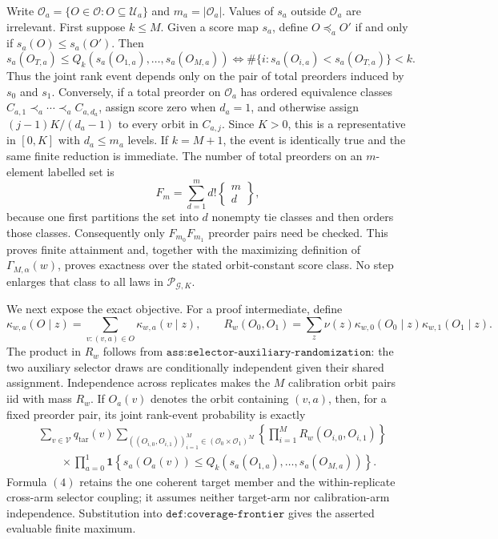 Write \(\mathcal O_a=\{O\in\mathcal O:O\subseteq\mathcal U_a\}\) and \(m_a=|\mathcal O_a|\). Values of \(s_a\) outside \(\mathcal O_a\) are irrelevant. First suppose \(k\le M\). Given a score map \(s_a\), define \(O\preceq_a O'\) if and only if \(s_a(O)\le s_a(O')\). Then
\[s_a(O_{T,a})\le Q_k(s_a(O_{1,a}),\ldots,s_a(O_{M,a}))\iff \#\{i:s_a(O_{i,a})<s_a(O_{T,a})\}<k.\tag{1}\]
Thus the joint rank event depends only on the pair of total preorders induced by \(s_0\) and \(s_1\). Conversely, if a total preorder on \(\mathcal O_a\) has ordered equivalence classes \(C_{a,1}\prec_a\cdots\prec_a C_{a,d_a}\), assign score zero when \(d_a=1\), and otherwise assign \((j-1)K/(d_a-1)\) to every orbit in \(C_{a,j}\). Since \(K>0\), this is a representative in \([0,K]\) with \(d_a\le m_a\) levels. If \(k=M+1\), the event is identically true and the same finite reduction is immediate. The number of total preorders on an \(m\)-element labelled set is
\[F_m=\sum_{d=1}^m d!\left\{\begin{matrix}m\\d\end{matrix}\right\},\tag{2}\]
because one first partitions the set into \(d\) nonempty tie classes and then orders those classes. Consequently only \(F_{m_0}F_{m_1}\) preorder pairs need be checked. This proves finite attainment and, together with the maximizing definition of \(\Gamma_{M,\alpha}(w)\), proves exactness over the stated orbit-constant score class. No step enlarges that class to all laws in \(\mathcal P_{\mathcal G,K}\).

We next expose the exact objective. For a proof intermediate, define
\[\kappa_{w,a}(O\mid z)=\sum_{v:(v,a)\in O}\kappa_{w,a}(v\mid z),\qquad R_w(O_0,O_1)=\sum_z\nu(z)\kappa_{w,0}(O_0\mid z)\kappa_{w,1}(O_1\mid z).\tag{3}\]
The product in \(R_w\) follows from \(\texttt{ass:selector-auxiliary-randomization}\): the two auxiliary selector draws are conditionally independent given their shared assignment. Independence across replicates makes the \(M\) calibration orbit pairs iid with mass \(R_w\). If \(O_a(v)\) denotes the orbit containing \((v,a)\), then, for a fixed preorder pair, its joint rank-event probability is exactly
\[\begin{split}
&\sum_{v\in\mathcal V}q_{\mathrm{tar}}(v)\!\sum_{((O_{i,0},O_{i,1}))_{i=1}^M\in(\mathcal O_0\times\mathcal O_1)^M}\!\left\{\prod_{i=1}^M R_w(O_{i,0},O_{i,1})\right\}\\
&\qquad\times\prod_{a=0}^1\mathbf 1\!\left\{s_a(O_a(v))\le Q_k(s_a(O_{1,a}),\ldots,s_a(O_{M,a}))\right\}.
\end{split}\tag{4}\]
Formula \((4)\) retains the one coherent target member and the within-replicate cross-arm selector coupling; it assumes neither target-arm nor calibration-arm independence. Substitution into \(\texttt{def:coverage-frontier}\) gives the asserted evaluable finite maximum.

